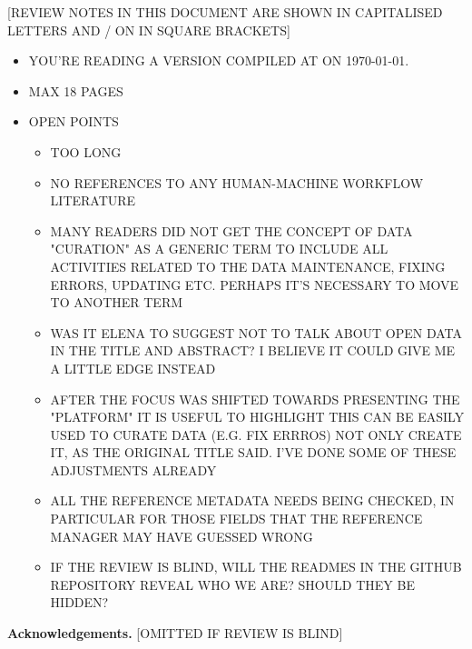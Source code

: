 \documentclass{llncs}
\begin{document}
[REVIEW NOTES IN THIS DOCUMENT ARE SHOWN IN CAPITALISED LETTERS AND / ON IN SQUARE BRACKETS] 
\begin{itemize}

    \item YOU'RE READING A VERSION COMPILED AT \currenttime ON \today.
    \item MAX 18 PAGES
    \item OPEN POINTS
        \begin{itemize}
            \item TOO LONG
            \item NO REFERENCES TO ANY HUMAN-MACHINE WORKFLOW LITERATURE
            \item MANY READERS DID NOT GET THE CONCEPT OF DATA "CURATION" AS A GENERIC TERM TO INCLUDE ALL ACTIVITIES RELATED TO THE DATA MAINTENANCE, FIXING ERRORS, UPDATING ETC.  PERHAPS IT'S NECESSARY TO MOVE TO ANOTHER TERM
            \item WAS IT ELENA TO SUGGEST NOT TO TALK ABOUT OPEN DATA IN THE TITLE AND ABSTRACT? I BELIEVE IT COULD GIVE ME A LITTLE EDGE INSTEAD
            \item AFTER THE FOCUS WAS SHIFTED TOWARDS PRESENTING THE "PLATFORM" IT IS USEFUL TO HIGHLIGHT THIS CAN BE EASILY USED TO CURATE DATA (E.G. FIX ERRROS) NOT ONLY CREATE IT, AS THE ORIGINAL TITLE SAID. I'VE DONE SOME OF THESE ADJUSTMENTS ALREADY
            \item ALL THE REFERENCE METADATA NEEDS BEING CHECKED, IN PARTICULAR FOR THOSE FIELDS THAT THE REFERENCE MANAGER MAY HAVE GUESSED WRONG
            \item IF THE REVIEW IS BLIND, WILL THE READMES IN THE GITHUB REPOSITORY REVEAL WHO WE ARE? SHOULD THEY BE HIDDEN?
        \end{itemize}
\end{itemize}









\vspace{5mm}
\textbf{Acknowledgements.} [OMITTED IF REVIEW IS BLIND]


\end{document}

